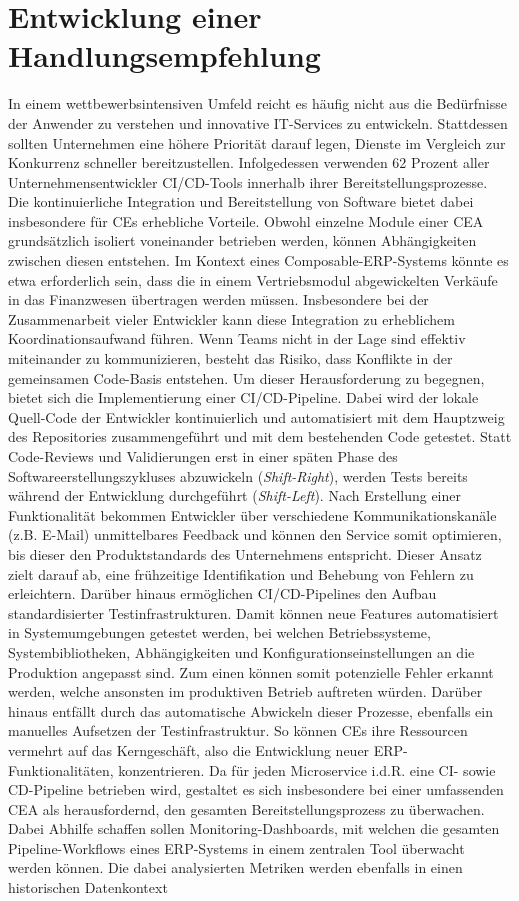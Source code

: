 
\section{Entwicklung einer Handlungsempfehlung}
\label{sec:Handlungsempfehlung}
In einem wettbewerbsintensiven Umfeld reicht es häufig nicht aus die Bedürfnisse der Anwender zu verstehen und innovative IT-Services zu entwickeln. Stattdessen sollten Unternehmen eine höhere Priorität darauf legen, Dienste im Vergleich zur Konkurrenz schneller bereitzustellen. Infolgedessen verwenden 62 Prozent aller Unternehmensentwickler CI/CD-Tools innerhalb ihrer Bereitstellungsprozesse. Die kontinuierliche Integration und Bereitstellung von Software bietet dabei insbesondere für CEs erhebliche Vorteile. Obwohl einzelne Module einer CEA grundsätzlich isoliert voneinander betrieben werden, können Abhängigkeiten zwischen diesen entstehen. Im Kontext eines Composable-ERP-Systems könnte es etwa erforderlich sein, dass die in einem Vertriebsmodul abgewickelten Verkäufe in das Finanzwesen übertragen werden müssen. Insbesondere bei der Zusammenarbeit vieler Entwickler kann diese Integration zu erheblichem Koordinationsaufwand führen. Wenn Teams nicht in der Lage sind effektiv miteinander zu kommunizieren, besteht das Risiko, dass Konflikte in der gemeinsamen Code-Basis entstehen. Um dieser Herausforderung zu begegnen, bietet sich die Implementierung einer CI/CD-Pipeline. Dabei wird der lokale Quell-Code der Entwickler kontinuierlich und automatisiert mit dem Hauptzweig des Repositories zusammengeführt und mit dem bestehenden Code getestet. Statt Code-Reviews und Validierungen erst in einer späten Phase des Softwareerstellungszykluses abzuwickeln (\textit{Shift-Right}), werden Tests bereits während der Entwicklung durchgeführt (\textit{Shift-Left}). Nach Erstellung einer Funktionalität bekommen Entwickler über verschiedene Kommunikationskanäle (z.B. E-Mail) unmittelbares Feedback und können den Service somit optimieren, bis dieser den Produktstandards des Unternehmens entspricht. Dieser Ansatz zielt darauf ab, eine frühzeitige Identifikation und Behebung von Fehlern zu erleichtern. Darüber hinaus ermöglichen CI/CD-Pipelines den Aufbau standardisierter Testinfrastrukturen. Damit können neue Features automatisiert in Systemumgebungen getestet werden, bei welchen Betriebssysteme, Systembibliotheken, Abhängigkeiten und Konfigurationseinstellungen an die Produktion angepasst sind. Zum einen können somit potenzielle Fehler erkannt werden, welche ansonsten im produktiven Betrieb auftreten würden.  Darüber hinaus entfällt durch das automatische Abwickeln dieser Prozesse, ebenfalls ein manuelles Aufsetzen der Testinfrastruktur. So können CEs ihre Ressourcen vermehrt auf das Kerngeschäft, also die Entwicklung neuer ERP-Funktionalitäten, konzentrieren. Da für jeden Microservice i.d.R. eine CI- sowie CD-Pipeline betrieben wird, gestaltet es sich insbesondere bei einer umfassenden CEA als herausfordernd, den gesamten Bereitstellungsprozess zu überwachen. Dabei Abhilfe schaffen sollen Monitoring-Dashboards, mit welchen die gesamten Pipeline-Workflows eines ERP-Systems in einem zentralen Tool überwacht werden können. Die dabei analysierten Metriken werden ebenfalls in einen historischen Datenkontext 